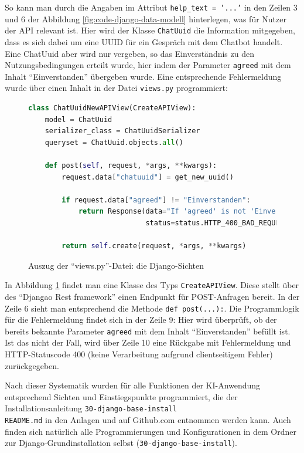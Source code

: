 \documentclass[12pt,oneside,titlepage,listof=totoc,bibliography=totoc]{scrartcl}
\newcommand{\code}[1]{\colorbox{code-gray}{\texttt{#1}}}
\begin{document}
So kann man durch die Angaben im Attribut \code{help_text = '...'} in den Zeilen 3 und 6 der Abbildung \ref{fig:code-django-data-modell} hinterlegen, was für Nutzer der API relevant ist. Hier wird \zb der Klasse \code{ChatUuid} die Information mitgegeben, dass es sich dabei um eine \ac{UUID} für ein Gespräch mit dem Chatbot handelt. Eine ChatUuid aber wird nur vergeben, so das Einverständnis zu den Nutzungsbedingungen erteilt wurde, hier indem der Parameter \code{agreed} mit dem Inhalt \enquote{Einverstanden} übergeben wurde. Eine entsprechende Fehlermeldung wurde über einen Inhalt in der Datei \code{views.py} programmiert: 

\begin{figure}[H]
	\caption{Auszug der \enquote{views.py}-Datei: die Django-Sichten}
	\label{fig:code-django-views}
\begin{lstlisting}[language=python]
class ChatUuidNewAPIView(CreateAPIView):
    model = ChatUuid
    serializer_class = ChatUuidSerializer
    queryset = ChatUuid.objects.all()

    def post(self, request, *args, **kwargs):
        request.data["chatuuid"] = get_new_uuid()

        if request.data["agreed"] != "Einverstanden":
            return Response(data="If 'agreed' is not 'Einverstanden' you can not use the services.",
                            status=status.HTTP_400_BAD_REQUEST)

        return self.create(request, *args, **kwargs)
\end{lstlisting}
\end{figure}

In Abbildung \ref{fig:code-django-views} findet man eine Klasse des Typs \code{CreateAPIView}. Diese stellt über des \enquote{Djangao Rest framework} einen Endpunkt für POST-Anfragen bereit. In der Zeile 6 sieht man entsprechend die Methode \code{def post(...):}. Die Programmlogik für die Fehlermeldung findet sich in der Zeile 9: Hier wird überprüft, ob der bereits bekannte Parameter \code{agreed} mit dem Inhalt \enquote{Einverstanden} befüllt ist. Ist das nicht der Fall, wird über Zeile 10 eine Rückgabe mit Fehlermeldung und HTTP-Statuscode 400 (keine Verarbeitung aufgrund clientseitigem Fehler) zurückgegeben.

Nach dieser Systematik wurden für alle Funktionen der KI-Anwendung entsprechend Sichten und Einstiegspunkte programmiert, die der Installationsanleitung \code{30-django-base-install\\README.md} in den Anlagen und auf Github.com entnommen werden kann. Auch finden sich natürlich alle Programmierungen und Konfigurationen in dem Ordner zur Django-Grundinstallation selbst (\code{30-django-base-install}). 
\end{document}
